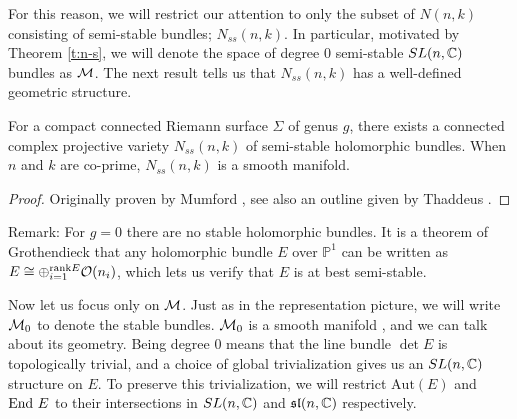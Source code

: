 	For this reason, we will restrict our attention to only the subset of $N(n,k)$ consisting of semi-stable bundles; $N_{ss}(n,k)$. In particular, motivated by Theorem \ref{t:n-s}, we will denote the space of degree $0$ semi-stable $SL(n,\mathbb{C})$ bundles as $\mathcal{M}$. The next result tells us that $N_{ss}(n,k)$ has a well-defined geometric structure. 
	\begin{theorem}
		For a compact connected Riemann surface $\Sigma$ of genus $g$, there exists a connected complex projective variety $N_{ss}(n,k)$ of semi-stable  holomorphic bundles. When $n$ and $k$ are co-prime, $N_{ss}(n,k)$ is a smooth manifold. 
	\end{theorem}
	\begin{proof}
		Originally proven by Mumford \cite{mumford_projective_2004}, see also an outline given by Thaddeus \cite[4]{andersen_introduction_2021}.
	\end{proof}
	Remark: For $g=0$ there are no stable holomorphic bundles. It is a theorem of Grothendieck \cite[Theorem 2.1]{grothendieck_sur_1957} that any holomorphic bundle $E$ over $\mathbb{P}^1$ can be written as $E \cong \oplus_{i=1}^{\text{rank} E} \mathcal{O}(n_i)$, which lets us verify that $E$ is at best semi-stable. 

	Now let us focus only on $\mathcal{M}$. Just as in the representation picture, we will write $\mathcal{M}_0$ to denote the stable bundles. $\mathcal{M}_0$ is a smooth manifold \cite[\S7]{atiyah_yang-mills_1983}, and we can talk about its geometry. Being degree 0 means that the line bundle $\det E$ is topologically trivial, and a choice of global trivialization gives us an $SL(n,\mathbb{C})$ structure on $E$. To preserve this trivialization, we will restrict $\text{Aut}(E)$ and $\text{End } E$ to their intersections in $SL(n,\mathbb{C})$ and $\mathfrak{sl}(n,\mathbb{C})$ respectively.
	
